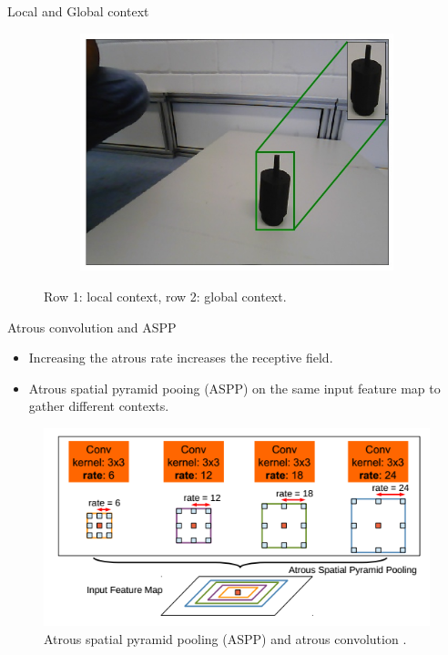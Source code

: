 \documentclass{beamer}
\begin{document}
\begin{frame}{Local and Global context}
\begin{figure}[h]
\begin{subfigure}{.49\textwidth}
			\label{Fig:em01g}
		\end{subfigure}
		\begin{subfigure}{.49\textwidth}
			\centering
			\includegraphics[width=.6\linewidth]{images/motor_context_g}
			\label{Fig:motorg}
		\end{subfigure}
		\captionsetup{justification=centering,margin=0.2cm}
		\caption{Row 1: local context, row 2: global context.}
		\label{Fig:context}
	\end{figure}

\end{frame}

\begin{frame}{Atrous convolution and ASPP}

	\begin{small}
		\begin{itemize}
			\item Increasing the atrous rate increases the receptive field.
			\item Atrous spatial pyramid pooing (ASPP) on the same input feature map to gather different contexts.
		\end{itemize}
	\end{small}
	
	\begin{figure}
		\centering
		\includegraphics[width=0.5\linewidth]{images/aspp}
		\captionsetup{justification=centering,margin=0.2cm}
		\caption{Atrous spatial pyramid pooling (ASPP) and atrous convolution \cite{DBLP:journals/corr/ChenPK0Y16}.}
		\label{Fig:deepLabv4}
	\end{figure}

\end{frame}
\end{document}
